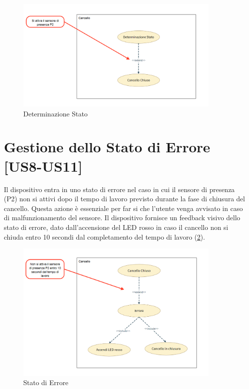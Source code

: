 \begin{figure}[H]
    \centering
    \includegraphics[width=0.9\textwidth]{figures/usecase_7.png}
    \caption{Determinazione Stato}
    \label{usecase7}
\end{figure}


\section{Gestione dello Stato di Errore [US8-US11]}
Il dispositivo entra in uno stato di errore nel caso in cui il sensore di presenza (P2) non si attivi dopo il tempo di lavoro previsto durante la fase di chiusura del cancello.
Questa azione è essenziale per far si che l'utente venga avvisato in caso di malfunzionamento del sensore.
Il dispositivo fornisce un feedback visivo dello stato di errore, dato dall'accensione del LED rosso in caso il cancello non si chiuda entro 10 secondi dal completamento del tempo di lavoro (\ref{usecase8}).

\begin{figure}[H]
    \centering
    \includegraphics[width=0.9\textwidth]{figures/usecase_8.png}
    \caption{Stato di Errore}
    \label{usecase8}
\end{figure}


